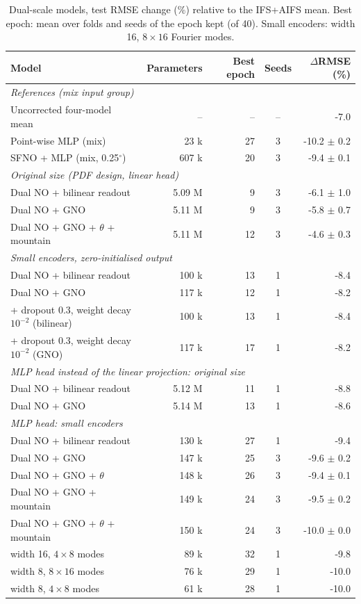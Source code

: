 \documentclass[10pt,a4paper]{article}
\begin{document}
\begin{table}[t]
\centering\small
\caption{Dual-scale models, test RMSE change (\%) relative to the IFS+AIFS mean. Best epoch: mean over
folds and seeds of the epoch kept (of 40). Small encoders: width 16, $8\times16$ Fourier modes.}
\label{tab:dual}
\footnotesize
\begin{tabular}{@{}lrrcr@{}}
\toprule
Model & Parameters & Best epoch & Seeds & $\Delta$RMSE (\%)\\
\midrule
\multicolumn{5}{l}{\emph{References (mix input group)}} \\
\quad Uncorrected four-model mean & -- & -- & -- & -7.0 \\
\quad Point-wise MLP (mix) & 23 k & 27 & 3 & -10.2 $\pm$ 0.2 \\
\quad SFNO + MLP (mix, 0.25$^\circ$) & 607 k & 20 & 3 & -9.4 $\pm$ 0.1 \\
\midrule
\multicolumn{5}{l}{\emph{Original size (PDF design, linear head)}} \\
\quad Dual NO + bilinear readout & 5.09 M & 9 & 3 & -6.1 $\pm$ 1.0 \\
\quad Dual NO + GNO & 5.11 M & 9 & 3 & -5.8 $\pm$ 0.7 \\
\quad Dual NO + GNO + $\theta$ + mountain & 5.11 M & 12 & 3 & -4.6 $\pm$ 0.3 \\
\midrule
\multicolumn{5}{l}{\emph{Small encoders, zero-initialised output}} \\
\quad Dual NO + bilinear readout & 100 k & 13 & 1 & -8.4 \\
\quad Dual NO + GNO & 117 k & 12 & 1 & -8.2 \\
\quad \quad + dropout 0.3, weight decay $10^{-2}$ (bilinear) & 100 k & 13 & 1 & -8.4 \\
\quad \quad + dropout 0.3, weight decay $10^{-2}$ (GNO) & 117 k & 17 & 1 & -8.2 \\
\midrule
\multicolumn{5}{l}{\emph{MLP head instead of the linear projection: original size}} \\
\quad Dual NO + bilinear readout & 5.12 M & 11 & 1 & -8.8 \\
\quad Dual NO + GNO & 5.14 M & 13 & 1 & -8.6 \\
\midrule
\multicolumn{5}{l}{\emph{MLP head: small encoders}} \\
\quad Dual NO + bilinear readout & 130 k & 27 & 1 & -9.4 \\
\quad Dual NO + GNO & 147 k & 25 & 3 & -9.6 $\pm$ 0.2 \\
\quad Dual NO + GNO + $\theta$ & 148 k & 26 & 3 & -9.4 $\pm$ 0.1 \\
\quad Dual NO + GNO + mountain & 149 k & 24 & 3 & -9.5 $\pm$ 0.2 \\
\quad Dual NO + GNO + $\theta$ + mountain & 150 k & 24 & 3 & -10.0 $\pm$ 0.0 \\
\quad \quad width 16, $4\times8$ modes & 89 k & 32 & 1 & -9.8 \\
\quad \quad width 8, $8\times16$ modes & 76 k & 29 & 1 & -10.0 \\
\quad \quad width 8, $4\times8$ modes & 61 k & 28 & 1 & -10.0 \\
\bottomrule
\end{tabular}
\end{table}
\end{document}
